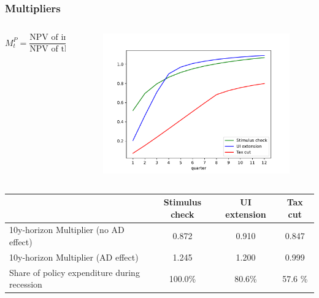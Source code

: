 \documentclass[pdflatex,aspectratio=169]{beamer}
\begin{document}
          \begin{frame}
            \frametitle{Multipliers}

            \begin{columns}

              \begin{column}{0.50\textwidth}
                \begin{equation*}
                  M^P_t = \frac{\text{NPV of induced consumption up to $t$}}{\text{NPV of the cost of the policy}}
                \end{equation*}
              \end{column}

              \begin{column}{0.50\textwidth}

                \begin{figure}[t]
                  \centering
                  \includegraphics[width=\linewidth]{Code/HA-Models/FromPandemicCode/Figures/Cummulative_multipliers}
                \end{figure}

              \end{column}
            \end{columns}




            \begin{table}[t]
              \center
              \begin{tabular}{@{}lccc@{}} 
                \toprule 
                & Stimulus check    & UI extension    & Tax cut     \\  \midrule 
                10y-horizon Multiplier (no AD effect) &0.872  & 0.910  & 0.847     \\ 
                10y-horizon Multiplier (AD effect) &1.245  & 1.200  & 0.999     \\ 
	Share of policy expenditure during recession &100.0\%  & 80.6\%  & 57.6 \%    \\ 
\end{tabular}  
\end{table}

\end{frame}
\end{document}
